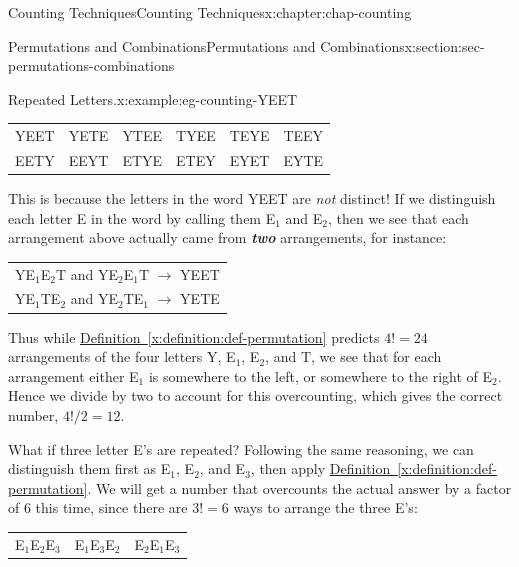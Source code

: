 \documentclass[oneside,10pt,]{book}
\newcommand{\tabularfont}{\relax}
\newcommand{\xreffont}{\relax}
\newcommand{\alert}[1]{\textbf{\textit{#1}}}
\numberwithin{equation}{section}
\begin{document}
\begin{chapterptx}{Counting Techniques}{}{Counting Techniques}{}{}{x:chapter:chap-counting}
\begin{sectionptx}{Permutations and Combinations}{}{Permutations and Combinations}{}{}{x:section:sec-permutations-combinations}
\begin{example}{Repeated Letters.}{x:example:eg-counting-YEET}
\begin{sidebyside}{1}{0.2}{0.2}{0}%
\begin{sbspanel}{0.6}%
{\centering%
{\tabularfont%
\begin{tabular}{llllll}
YEET&YETE&YTEE&TYEE&TEYE&TEEY\tabularnewline[0pt]
EETY&EEYT&ETYE&ETEY&EYET&EYTE
\end{tabular}
}%
\par}
\end{sbspanel}%
\end{sidebyside}%
\par
This is because the letters in the word YEET are \emph{not} distinct! If we distinguish each letter E in the word by calling them E\(_1\) and E\(_2\), then we see that each arrangement above actually came from \alert{two} arrangements, for instance:%
\begin{sidebyside}{1}{0.15}{0.15}{0}%
\begin{sbspanel}{0.7}%
{\centering%
{\tabularfont%
\begin{tabular}{l}
YE\(_1\)E\(_2\)T and YE\(_2\)E\(_1\)T \(\rightarrow\) YEET\tabularnewline[0pt]
YE\(_1\)TE\(_2\) and YE\(_2\)TE\(_1\) \(\rightarrow\) YETE
\end{tabular}
}%
\par}
\end{sbspanel}%
\end{sidebyside}%
\par
Thus while \hyperref[x:definition:def-permutation]{Definition~{\xreffont\ref{x:definition:def-permutation}}} predicts \(4! = 24\) arrangements of the four letters Y, E\(_1\), E\(_2\), and T, we see that for each arrangement either E\(_1\) is somewhere to the left, or somewhere to the right of E\(_2\). Hence we divide by two to account for this overcounting, which gives the correct number, \(4!/2 = 12\).%
\end{example}
What if three letter E's are repeated? Following the same reasoning, we can distinguish them first as E\(_1\), E\(_2\), and E\(_3\), then apply \hyperref[x:definition:def-permutation]{Definition~{\xreffont\ref{x:definition:def-permutation}}}. We will get a number that overcounts the actual answer by a factor of 6 this time, since there are \(3! = 6\) ways to arrange the three E's:%
\begin{sidebyside}{1}{0.1}{0.1}{0}%
\begin{sbspanel}{0.8}%
{\centering%
{\tabularfont%
\begin{tabular}{lll}
E\(_1\)E\(_2\)E\(_3\)&E\(_1\)E\(_3\)E\(_2\)&E\(_2\)E\(_1\)E\(_3\)\tabularnewline[0pt]

\end{tabular}}}
\end{sbspanel}
\end{sidebyside}
\end{sectionptx}
\end{chapterptx}
\end{document}
